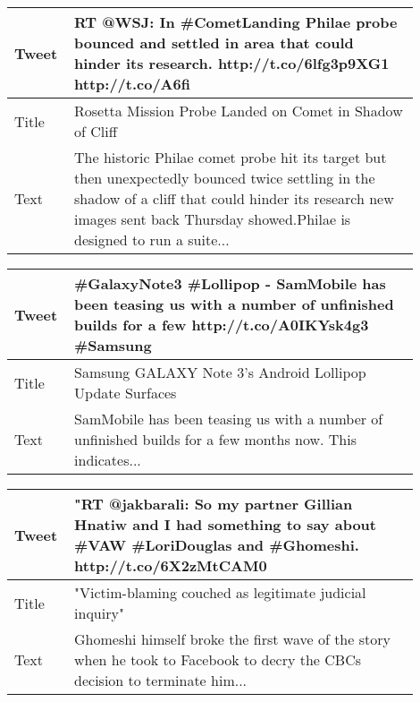 \begin{table}[!htbp]
\centering
\begin{tabular}{|p{0.1\linewidth}|p{0.8\linewidth}|}
\hline
Tweet &   RT @WSJ: In \#CometLanding Philae probe bounced and settled in area that could hinder its research. http://t.co/6lfg3p9XG1 http://t.co/A6fi  \\ \hline
Title &   Rosetta Mission Probe Landed on Comet in Shadow of Cliff	                                                                                 \\ \hline
Text  &  The historic Philae comet probe hit its target but then unexpectedly bounced twice settling in the shadow of a cliff that could hinder its research new images sent back Thursday showed.Philae is designed to run a suite...                                                                                         \\ \hline
\end{tabular}
\label{tab:exq1no}
\end{table}


\begin{table}[!htbp]
\centering
\begin{tabular}{|p{0.1\linewidth}|p{0.8\linewidth}|}
\hline
Tweet & \#GalaxyNote3 \#Lollipop - SamMobile has been teasing us with a number of unfinished builds for a few http://t.co/A0IKYsk4g3 \#Samsung \\ \hline
Title &   Samsung GALAXY Note 3's Android Lollipop Update Surfaces                                                                                 \\ \hline
Text  &  SamMobile has been teasing us with a number of unfinished builds for a few months now. This indicates...                                                                                         \\ \hline
\end{tabular}
\label{tab:exq1yes}
\end{table}


\begin{table}[!htbp]
\centering
\begin{tabular}{|p{0.1\linewidth}|p{0.8\linewidth}|}
\hline
Tweet & "RT @jakbarali: So my partner Gillian Hnatiw and I had something to say about \#VAW \#LoriDouglas and \#Ghomeshi. http://t.co/6X2zMtCAM0 \\ \hline
Title & "Victim-blaming couched as legitimate judicial inquiry" \\ \hline
Text  & Ghomeshi himself broke the first wave of the story when he took to Facebook to decry the CBCs decision to terminate him... \\ \hline
\end{tabular}
\label{tab:exq2no}
\end{table}


